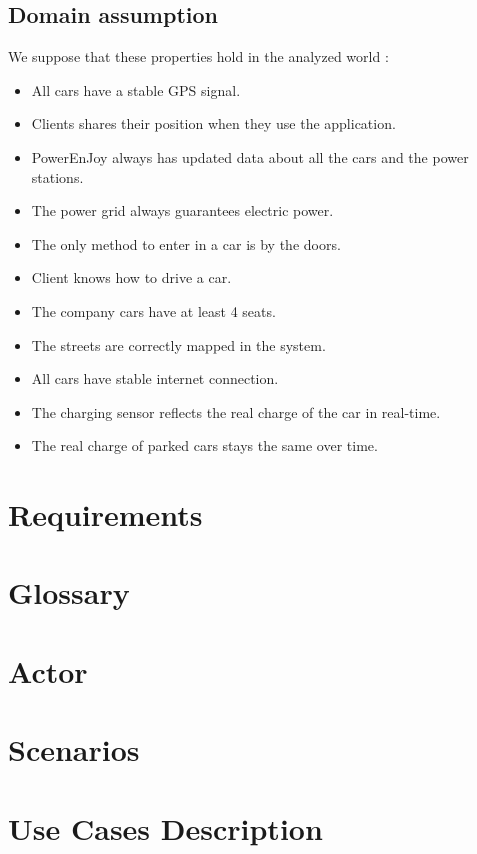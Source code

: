 \documentclass[a4paper]{article}
\begin{document}
\subsection{Domain assumption}
We suppose that these properties hold in the analyzed world :
\begin{itemize}
\item All cars have a stable GPS signal.
\item Clients shares their position when they use the application.
\item PowerEnJoy always has updated data about all the cars and the power stations.
\item The power grid always guarantees electric power.
\item The only method to enter in a car is by the doors.
\item Client knows how to drive a car.
\item The company cars have at least 4 seats.
\item The streets are correctly mapped in the system.
\item All cars have stable internet connection.
\item The charging sensor reflects the real charge of the car in real-time.
\item The real charge of parked cars stays the same over time. 
\end{itemize}


\newpage
\section{Requirements}


\newpage

\section{Glossary}


\section{Actor}

\newpage

\section{Scenarios}


\newpage
\section{Use Cases Description}

\end{document}
